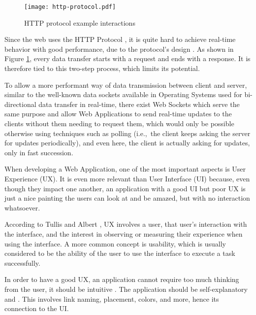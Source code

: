 \begin{figure}[t]
    \begin{center}
      \leavevmode
      \texttt{[image: http-protocol.pdf]}
      \caption{HTTP protocol example interactions}
      \label{fig:http-protocol}
    \end{center}
  \end{figure}

Since the web uses the HTTP Protocol \cite{http1-1protocol} \cite{http2protocol}, it is quite hard to achieve real-time behavior with good performance, due to the protocol's design \cite{Spero1994}. As shown in Figure \ref{fig:http-protocol}, every data transfer starts with a request and ends with a response. It is therefore tied to this two-step process, which limits its potential. 

To allow a more performant way of data transmission between client and server, similar to the well-known data sockets available in Operating Systems used for bi-directional data transfer in real-time, there exist Web Sockets \cite{websocket-protocol} which serve the same purpose and allow Web Applications to send real-time updates to the clients without them needing to request them, which would only be possible otherwise using techniques such as polling (i.e.,\ the client keeps asking the server for updates periodically), and even here, the client is actually asking for updates, only in fast succession.

When developing a Web Application, one of the most important aspects is User Experience (UX). It is even more relevant than User Interface (UI) because, even though they impact one another, an application with a good UI but poor UX is just a nice painting the users can look at and be amazed, but with no interaction whatsoever.

According to Tullis and Albert \cite{measuring-user-experience-tullis}, UX involves a user, that user's interaction with the interface, and the interest in observing or measuring their experience when using the interface. A more common concept is usability, which is usually considered to be the ability of the user to use the interface to execute a task successfully.

In order to have a good UX, an application cannot require too much thinking from the user, it should be intuitive \cite{Krug2013-ux}. The application should be self-explanatory and . This involves link naming, placement, colors, and more, hence its connection to the UI.

